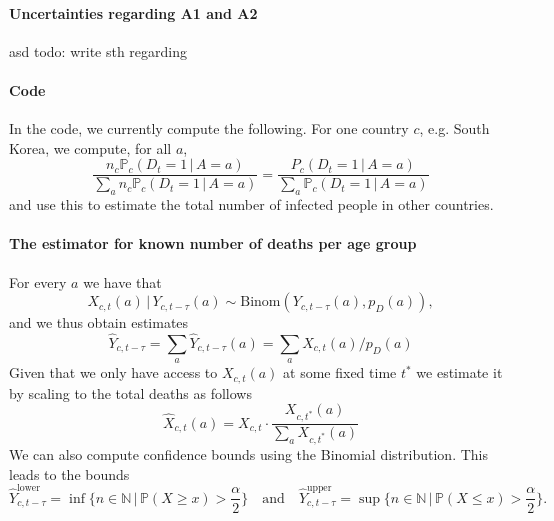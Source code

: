 \documentclass[a4paper]{article}
\newcommand\N{\mathbb{N}}
\newcommand\todo[1]{{\color{red}todo: #1}}
\renewcommand\P{\mathbb{P}}
\newcommand{\given}{\, \vert \,}
\begin{document}
\paragraph{Uncertainties regarding A1 and A2}
asd
\todo{write sth regarding}


\paragraph{Code}
In the code, we currently compute the following. 
For one country $c$, e.g. South Korea, we compute, for all $a$,
$$
\frac{n_c \P_c(D_t = 1\,|\,A = a)}
{\sum_a n_c \P_c(D_t = 1\,|\,A = a)}
=
\frac{P_c(D_t = 1\,|\,A = a)}
{\sum_a \P_c(D_t = 1\,|\,A = a)}
$$
and use this to estimate the total number 
of infected people in other countries.




\paragraph{The estimator for known number of deaths per age group}
%
For every $a$ we have that 
$$X_{c,t}(a) \given Y_{c,t-\tau}(a) \sim \text{Binom}(Y_{c,t-\tau}(a), p_D(a)),$$
and we thus obtain estimates 
$$\hat{Y}_{c,t-\tau} = \sum_a \hat{Y}_{c,t-\tau}(a) =\sum_a
X_{c,t}(a) / p_D(a)$$
Given that we only have access to $X_{c,t}(a)$ at some fixed time
$t^*$ we estimate it by scaling to the total deaths as follows
\begin{equation*}
  \hat{X}_{c,t}(a)=X_{c,t}\cdot\frac{X_{c,t^*}(a)}{\sum_a X_{c,t^*}(a)}
\end{equation*}
We can also compute confidence bounds using the Binomial distribution. This
leads to the bounds
\begin{equation*}
  \hat{Y}_{c,t-\tau}^{\text{lower}} = \inf\{n\in\N \,\vert\, \P(X\geq
  x)>\frac{\alpha}{2}\}
  \quad\text{and}\quad
  \hat{Y}_{c,t-\tau}^{\text{upper}} = \sup\{n\in\N \,\vert\, \P(X\leq
  x)>\frac{\alpha}{2}\}.
\end{equation*}
\end{document}
